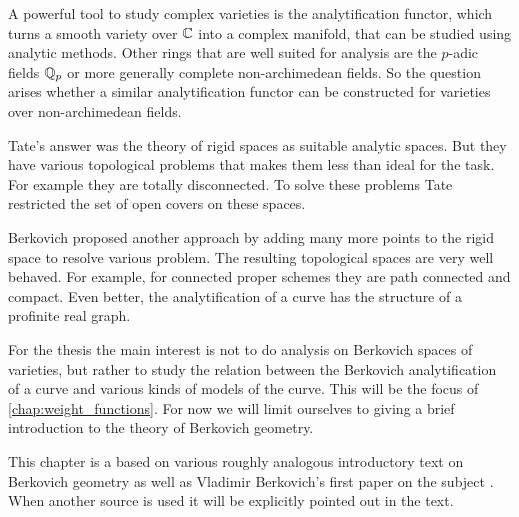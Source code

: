 
A powerful tool to study complex varieties is the analytification functor, which turns a  smooth variety over $\mathbb{C}$ into a complex manifold, that can be studied using analytic methods. 
Other rings that are well suited for analysis are the $p$-adic fields $\mathbb{Q}_p$ or more generally complete non-archimedean fields. 
So the question arises whether a similar analytification functor can be constructed for  varieties over non-archimedean fields. 

Tate's answer was the theory of rigid spaces as suitable analytic spaces. 
But they have various topological problems that makes them less than ideal for the task. 
For example they are totally disconnected. To solve these problems Tate restricted the set of open covers on these spaces. 

Berkovich proposed another approach by adding many more points to the rigid space to resolve various problem. 
The resulting topological spaces are very well behaved. 
For example, for connected proper schemes they are path connected and compact. 
Even better, the analytification of a curve has the structure of a profinite real graph. 

For the thesis the main interest is not to do analysis on Berkovich spaces of varieties, but rather to study the relation between the Berkovich analytification of a curve and various kinds of models of the curve. This will be the focus of \cref{chap:weight_functions}. 
For now we will limit ourselves to giving a brief introduction to the theory of Berkovich geometry. 

This chapter is a based on various roughly analogous introductory text on Berkovich geometry \cite{bakerarizona,temkinIntroductionBerkovichAnalytic2010,nicaiseNonarchimedeanGeometry2017,boschLecturesFormalRigid2014, wojciechwawrowBerkovicSpaces2020} as well as Vladimir Berkovich's first paper on the subject \cite{berkovichSpectralTheoryAnalytic2012}.
When another source is used it will be explicitly pointed out in the text. 

